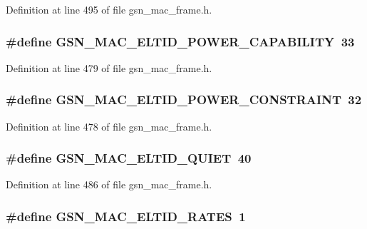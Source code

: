Definition at line 495 of file gsn\_\-mac\_\-frame.h.

\hypertarget{a00523_aed7f21f9e5d99e9524709b96b95ffe5c}{
\subsubsection[{GSN\_\-MAC\_\-ELTID\_\-POWER\_\-CAPABILITY}]{\setlength{\rightskip}{0pt plus 5cm}\#define GSN\_\-MAC\_\-ELTID\_\-POWER\_\-CAPABILITY~33}}
\label{a00523_aed7f21f9e5d99e9524709b96b95ffe5c}


Definition at line 479 of file gsn\_\-mac\_\-frame.h.

\hypertarget{a00523_a36e02d3ccab307876a3f67fb5e469c38}{
\subsubsection[{GSN\_\-MAC\_\-ELTID\_\-POWER\_\-CONSTRAINT}]{\setlength{\rightskip}{0pt plus 5cm}\#define GSN\_\-MAC\_\-ELTID\_\-POWER\_\-CONSTRAINT~32}}
\label{a00523_a36e02d3ccab307876a3f67fb5e469c38}


Definition at line 478 of file gsn\_\-mac\_\-frame.h.

\hypertarget{a00523_ab483b87fc0080afaa038193e398c22eb}{
\subsubsection[{GSN\_\-MAC\_\-ELTID\_\-QUIET}]{\setlength{\rightskip}{0pt plus 5cm}\#define GSN\_\-MAC\_\-ELTID\_\-QUIET~40}}
\label{a00523_ab483b87fc0080afaa038193e398c22eb}


Definition at line 486 of file gsn\_\-mac\_\-frame.h.

\hypertarget{a00523_aa284ef171fe5182bcb5457f85feb65aa}{
\subsubsection[{GSN\_\-MAC\_\-ELTID\_\-RATES}]{\setlength{\rightskip}{0pt plus 5cm}\#define GSN\_\-MAC\_\-ELTID\_\-RATES~1}}
\label{a00523_aa284ef171fe5182bcb5457f85feb65aa}


